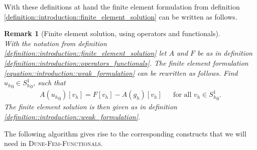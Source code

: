\documentclass[a4paper,11pt]{article}
\numberwithin{equation}{section}
\newtheorem{remark}[definition]{Remark}
\newcommand{\theoremNewline}{\hspace{1mm}\\}
\newcommand{\theoremEndLine}{\hspace{1mm}}
\newcommand{\dunefemfunctionals}{\textsc{Dune-Fem-Functionals}\xspace}
\newcommand{\punkt}{\text{.}}
\begin{document}
    With these definitions at hand the finite element formulation from definition
    \ref{definition::introduction::finite_element_solution} can be written as follows.

    \begin{remark}[Finite element solution, using operators and functionals]\theoremNewline
      \label{remark::introduction::variational_formulation_functionals_operators}
      With the notation from definition \ref{definition::introduction::finite_element_solution} let $A$ and $F$ be as in
      definition \ref{definition::introduction::operators_functionals}. The finite element formulation
      \eqref{equation::introduction::weak_formulation} can be rewritten as follows.
      Find ${{u_h}_0 \in {S^1_h}_0}$, such that
      \begin{align}
        \label{equation::introduction::finite_element_formulation_functionals_operators}
        A({u_h}_0)[v_h] = F[v_h] - A(g_h)[v_h] &&\text{for all } v_h \in {S^1_h}_0 \punkt
      \end{align}
      The finite element solution is then given as in definition \ref{definition::introduction::weak_formulation}.
    \end{remark}\theoremEndLine

    The following algorithm gives rise to the corresponding constructs that we will need in \dunefemfunctionals.
\end{document}
